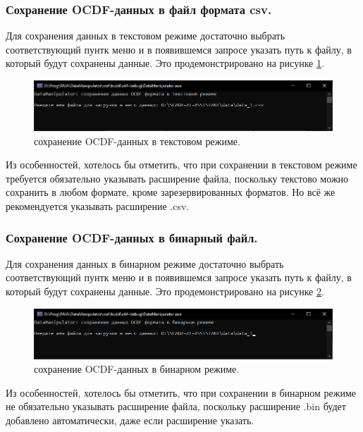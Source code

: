 \subsubsection{ \standartTitleFont
  Сохранение OCDF-данных в файл формата csv.
} \label{subsubsec:OCDFSafeCSV}

{\standartFont

  \par Для сохранения данных в текстовом режиме достаточно выбрать соответствующий пунтк меню и в появившемся запросе указать путь к файлу, в который будут сохранены данные. Это продемонстрировано на рисунке \ref{fig:OCDFsafeCSV}.

  \begin{figure}[H]
    \centering
    \includegraphics[width=\textwidth]{images/forDataManipulator/OCDFsafeCSV.png}
    \caption{сохранение OCDF-данных в текстовом режиме.} 
    \label{fig:OCDFsafeCSV}
  \end{figure}

  \par Из особенностей, хотелось бы отметить, что при сохранении в текстовом режиме требуется обязательно указывать расширение файла, поскольку текстово можно сохранить в любом формате, кроме зарезервированных форматов. Но всё же рекомендуется указывать расширение .csv.
}

\subsubsection{ \standartTitleFont
  Сохранение OCDF-данных в бинарный файл.
} \label{subsubsec:OCDFSafeBIN}

{\standartFont

  \par Для сохранения данных в бинарном режиме достаточно выбрать соответствующий пунтк меню и в появившемся запросе указать путь к файлу, в который будут сохранены данные. Это продемонстрировано на рисунке \ref{fig:OCDFsafeBIN}.

  \begin{figure}[H]
    \centering
    \includegraphics[width=\textwidth]{images/forDataManipulator/OCDFsafeBIN.png}
    \caption{сохранение OCDF-данных в бинарном режиме.} 
    \label{fig:OCDFsafeBIN}
  \end{figure}

  \par Из особенностей, хотелось бы отметить, что при сохранении в бинарном режиме не обязательно указывать расширение файла, поскольку расширение .bin будет добавлено автоматически, даже если расширение указать. 
}

